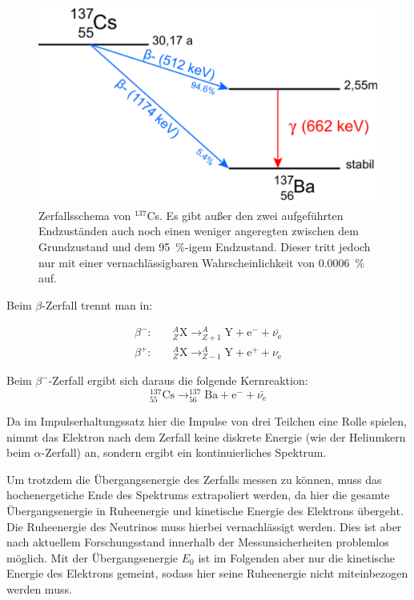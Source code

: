 \documentclass[
	a4paper,
	12pt,
	pagesize,
	ngerman
]{scrartcl}
\begin{document}
	\begin{figure}[H]
			\includegraphics[width= 0.6 \linewidth]{img/cs-137-zerfallsschema}
			\caption{
			Zerfallsschema von $^{137}$Cs.
			Es gibt außer den zwei aufgeführten Endzuständen auch noch einen weniger angeregten zwischen dem Grundzustand und dem \SI{95}{\percent}-igem Endzustand.
			Dieser tritt jedoch nur mit einer vernachlässigbaren Wahrscheinlichkeit von \SI{0.0006}{\percent} auf.
			\cite{Leifi}
			}
			\label{fig_Zerfallsschema}
	\end{figure}

	Beim $\beta$-Zerfall trennt man in: %

	\begin{align}
		\beta^-: \quad & _{Z}^{A}\text{X} \rightarrow _{Z+1}^{A}\text{Y} + \text{e}^- + \bar{\nu_{\text{e}}}\\
		\beta^+: \quad & _{Z}^{A}\text{X} \rightarrow _{Z-1}^{A}\text{Y} + \text{e}^+ + \nu_{\text{e}}
	\end{align}

		Beim $\beta^-$-Zerfall ergibt sich daraus die folgende Kernreaktion:
		\begin{equation}
			\label{eq_beta-minus}
			 _{55}^{137}\text{Cs} \rightarrow _{56}^{137}\text{Ba} + \text{e}^- + \bar{\nu_{\text{e}}}
		\end{equation}

		Da im Impulserhaltungssatz hier die Impulse von drei Teilchen eine Rolle spielen, nimmt das Elektron nach dem Zerfall keine diskrete Energie (wie der Heliumkern beim $\alpha$-Zerfall) an, sondern ergibt ein kontinuierliches Spektrum.

		Um trotzdem die Übergangsenergie des Zerfalls messen zu können, muss das hochenergetiche Ende des Spektrums extrapoliert werden, da hier die gesamte Übergangsenergie in Ruheenergie und kinetische Energie des Elektrons übergeht.
		Die Ruheenergie des Neutrinos muss hierbei vernachlässigt werden.
		Dies ist aber nach aktuellem Forschungsstand innerhalb der Messunsicherheiten problemlos möglich.
		Mit der Übergangsenergie $E_0$ ist im Folgenden aber nur die kinetische Energie des Elektrons gemeint, sodass hier seine Ruheenergie nicht miteinbezogen werden muss.
\end{document}
